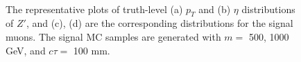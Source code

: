 \begin{figure}[!htb]
    \centering
     \\
    \caption{The representative plots of truth-level (a) $p_{T}$ and (b) $\eta$ distributions of $Z'$, and (c), (d) are the corresponding distributions for the signal muons. The signal MC samples are generated with $m=$ 500, 1000 GeV, and $c\tau=$ 100 mm.}
    \label{fig:truth_zp_muon}
\end{figure}
